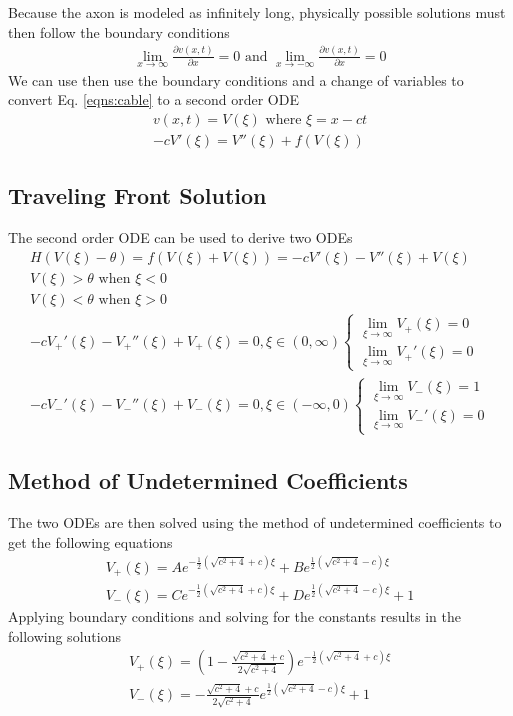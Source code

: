 \documentclass{article}
\begin{document}
Because the axon is modeled as infinitely long, physically possible solutions must then follow the boundary conditions
\begin{gather*}
\lim_{x \to\infty} \frac{\partial v(x,t)}{\partial x}=0
\textrm{ and }
\lim_{x \to-\infty} \frac{\partial v(x,t)}{\partial x}=0
\end{gather*}
We can use then use the boundary conditions and a change of variables to convert Eq. \ref{eqns:cable} to a second order ODE
\begin{gather*}
v(x,t)=V(\xi)
\textrm{ where }
\xi = x-ct\\
-cV'(\xi)=V''(\xi)+f(V(\xi))
\end{gather*}

\subsection{Traveling Front Solution} 

The second order ODE can be used to derive two ODEs
\begin{gather*} 
H(V(\xi)-\theta)=f(V(\xi)+V(\xi))=-cV'(\xi)-V''(\xi)+V(\xi)\\
V(\xi)>\theta \textrm{ when } \xi<0\\
V(\xi)<\theta \textrm{ when } \xi>0\\
-cV_+'(\xi)-V_+''(\xi)+V_+(\xi)=0, \xi \in (0,\infty)
    \begin{cases}
        \lim_{\xi \to\infty} V_+(\xi)=0\\
        \lim_{\xi \to\infty} V_+'(\xi)=0
    \end{cases}\\
-cV_-'(\xi)-V_-''(\xi)+V_-(\xi)=0, \xi \in (-\infty,0)
    \begin{cases}
        \lim_{\xi \to\infty} V_-(\xi)=1\\
        \lim_{\xi \to\infty} V_-'(\xi)=0
    \end{cases}
\end{gather*}

\subsection{Method of Undetermined Coefficients} 

The two ODEs are then solved using the method of undetermined coefficients to get the following equations
\begin{gather*} 
V_+(\xi)=Ae^{-\frac{1}{2}(\sqrt{c^2+4}+c)\xi}+Be^{\frac{1}{2}(\sqrt{c^2+4}-c)\xi}\\
V_-(\xi)=Ce^{-\frac{1}{2}(\sqrt{c^2+4}+c)\xi}+De^{\frac{1}{2}(\sqrt{c^2+4}-c)\xi}+1
\end{gather*}
Applying boundary conditions and solving for the constants results in the following solutions
\begin{gather*}
V_+(\xi)=(1-\frac{\sqrt{c^2+4}+c}{2\sqrt{c^2+4}})e^{-\frac{1}{2}(\sqrt{c^2+4}+c)\xi}\\
V_-(\xi)=-\frac{\sqrt{c^2+4}+c}{2\sqrt{c^2+4}}e^{\frac{1}{2}(\sqrt{c^2+4}-c)\xi}+1
\end{gather*}
\end{document}
